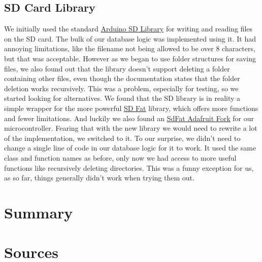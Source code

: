 \documentclass{article}
\begin{document}
\subsection{SD Card Library}
We initially used the standard \href{https://github.com/arduino-libraries/SD}{Arduino SD Library} for writing and reading files on the SD card. The bulk of our database logic was implemented using it.
It had annoying limitations, like the filename not being allowed to be over 8 characters, but that was acceptable.
However as we began to use folder structures for saving files, we also found out that the library doesn't support deleting a folder containing other files, even though the documentation states that the folder deletion works recursively.
This was a problem, especially for testing, so we started looking for alternatives. We found that the SD library is in reality a simple wrapper for the more powerful \href{https://github.com/greiman/SdFat}{SD Fat} library, which offers more functions and fewer limitations.
And luckily we also found an \href{https://github.com/adafruit/SdFat}{SdFat Adafruit Fork} for our microcontroller. Fearing that with the new library we would need to rewrite a lot of the implementation, we switched to it.
To our surprise, we didn't need to change a single line of code in our database logic for it to work. It used the same class and function names as before, only now we had access to more useful functions like recursively deleting directories.
This was a funny exception for us, as so far, things generally didn't work when trying them out.
\section{Summary}

\section{Sources}





\end{document}
